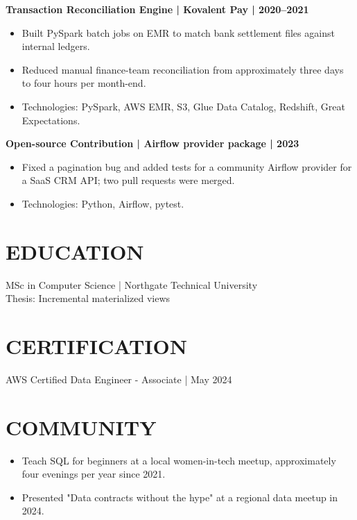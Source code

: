 \documentclass[11pt,a4paper]{article}
\begin{document}
\textbf{Transaction Reconciliation Engine | Kovalent Pay | 2020–2021}
\begin{itemize}
\item Built PySpark batch jobs on EMR to match bank settlement files against internal ledgers.
\item Reduced manual finance-team reconciliation from approximately three days to four hours per month-end.
\item Technologies: PySpark, AWS EMR, S3, Glue Data Catalog, Redshift, Great Expectations.
\end{itemize}

\textbf{Open-source Contribution | Airflow provider package | 2023}
\begin{itemize}
\item Fixed a pagination bug and added tests for a community Airflow provider for a SaaS CRM API; two pull requests were merged.
\item Technologies: Python, Airflow, pytest.
\end{itemize}

\section*{EDUCATION}
MSc in Computer Science | Northgate Technical University\\
Thesis: Incremental materialized views

\section*{CERTIFICATION}
AWS Certified Data Engineer - Associate | May 2024

\section*{COMMUNITY}
\begin{itemize}
\item Teach SQL for beginners at a local women-in-tech meetup, approximately four evenings per year since 2021.
\item Presented "Data contracts without the hype" at a regional data meetup in 2024.
\end{itemize}
\end{document}
